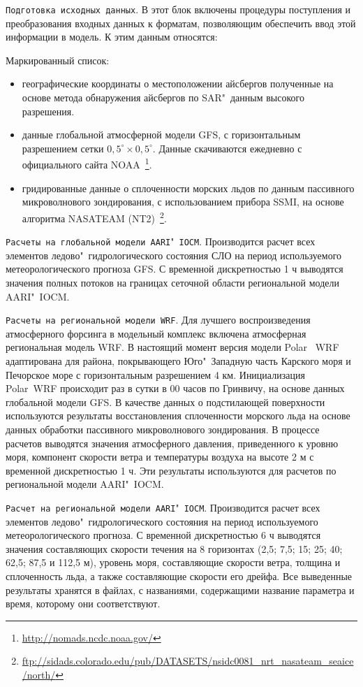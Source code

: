 \verb|Подготовка исходных данных|. В этот блок включены процедуры поступления
и преобразования входных данных к форматам, позволяющим обеспечить ввод этой
информации в модель. К этим данным относятся:

\noindent Маркированный список:
\begin{itemize}
	\item географические координаты о местоположении айсбергов полученные на основе метода обнаружения айсбергов по SAR"~данным высокого разрешения.
	\item данные глобальной атмосферной модели GFS, с горизонтальным разрешением 	сетки $0,5^\circ \times 0,5^\circ$. Данные скачиваются ежедневно с официального сайта NOAA~\footnote{\url{http://nomads.ncdc.noaa.gov/}}.
	\item гридированные данные о сплоченности морских льдов по данным пассивного микроволнового зондирования, с использованием прибора SSMI, на основе
	алгоритма NASATEAM (NT2)~\footnote{\url{ftp://sidads.colorado.edu/pub/DATASETS/nsidc0081_nrt_nasateam_seaice/north/}}.
\end{itemize}

\verb|Расчеты на глобальной модели AARI|"~\verb|IOCM|. Производится расчет всех элементов ледово"~гидрологического состояния СЛО на период используемого метеорологического прогноза GFS. С временной дискретностью 1 ч выводятся значения полных потоков на границах сеточной области региональной модели AARI"~IOCM.  

\verb|Расчеты на региональной модели WRF|. Для лучшего воспроизведения атмосферного форсинга в модельный комплекс включена атмосферная региональная модель WRF. В настоящий момент версия модели Polar~ WRF~\cite{bromwich2009development} адаптирована для района, покрывающего Юго"~Западную часть Карского моря и Печорское море с горизонтальным разрешением 4 км. Инициализация Polar~WRF происходит раз в сутки в 00 часов по Гринвичу, на основе данных глобальной модели GFS. В качестве данных о подстилающей поверхности используются результаты восстановления сплоченности морского льда на основе данных обработки пассивного микроволнового зондирования. В процессе расчетов выводятся значения атмосферного давления, приведенного к уровню моря, компонент скорости ветра и температуры воздуха на высоте 2 м с временной дискретностью 1 ч. Эти результаты используются для расчетов по региональной модели AARI"~IOCM.

\verb|Расчет на региональной модели AARI|"~\verb|IOCM|. Производится расчет всех элементов ледово"~гидрологического состояния на период используемого метеорологического прогноза. С временной дискретностью 6 ч выводятся значения составляющих скорости течения на 8 горизонтах (2,5; 7,5; 15; 25; 40; 62,5; 87,5 и 112,5 м), уровень моря, составляющие скорости ветра, толщина и сплоченность льда, а также составляющие скорости его дрейфа. Все выведенные результаты хранятся в файлах, с названиями, содержащими название параметра и время, которому они соответствуют.

